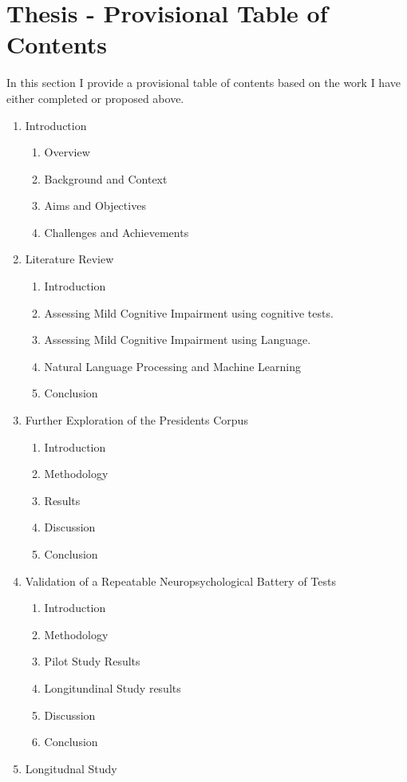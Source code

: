 \documentclass[10pt, letterpaper, twoside, openany]{book}
\begin{document}
\section{Thesis - Provisional Table of Contents}
In this section I provide a provisional table of contents based on the work I have either completed or proposed above.
\begin{enumerate}
	\item Introduction
	\begin{enumerate}
		\item Overview
		\item Background and Context
		\item Aims and Objectives
		\item Challenges and Achievements
	\end{enumerate}
	\item Literature Review
	\begin{enumerate}
		\item Introduction
		\item Assessing Mild Cognitive Impairment using cognitive tests.
		\item Assessing Mild Cognitive Impairment using Language.
		\item Natural Language Processing and Machine Learning
		\item Conclusion
	\end{enumerate}
	\item Further Exploration of the Presidents Corpus
	\begin{enumerate}
		\item Introduction
		\item Methodology
		\item Results
		\item Discussion
		\item Conclusion
	\end{enumerate}
	\item Validation of a Repeatable Neuropsychological Battery of Tests
	\begin{enumerate}
		\item Introduction
		\item Methodology
		\item Pilot Study Results
		\item Longitundinal Study results
		\item Discussion
		\item Conclusion
	\end{enumerate}
	\item Longitudnal Study

\end{enumerate}
\end{document}
